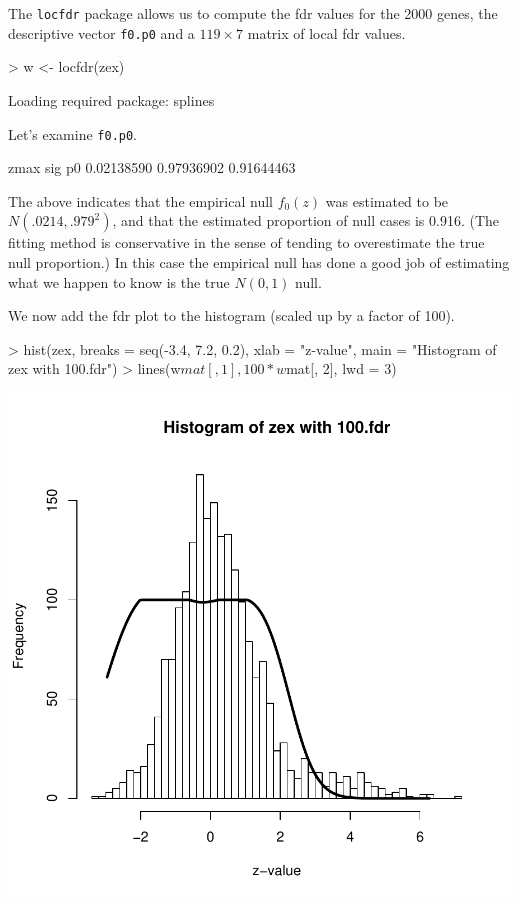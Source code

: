 \documentclass[11pt]{article}
\begin{document}
The \texttt{locfdr} package allows us to compute the fdr values for
the 2000 genes, the descriptive vector \texttt{f0.p0} and a $119\times
7$ matrix of local fdr values.

\begin{Schunk}
\begin{Sinput}
> w <- locfdr(zex)
\end{Sinput}
\begin{Soutput}
Loading required package: splines 
\end{Soutput}
\end{Schunk}

Let's examine \texttt{f0.p0}. 

\begin{Schunk}
\begin{Soutput}
      zmax        sig         p0 
0.02138590 0.97936902 0.91644463 
\end{Soutput}
\end{Schunk}

The above indicates that the empirical null $f_0(z)$ was estimated to
be $N(.0214,.979^2)$, and that the estimated proportion of null cases
is 0.916. (The fitting method is conservative in the sense of tending
to overestimate the true null proportion.) In this case the empirical
null has done a good job of estimating what we happen to know is the
true $N(0,1)$ null.

We now add the fdr plot to the histogram (scaled up by a factor of
100).

\begin{Schunk}
\begin{Sinput}
> hist(zex, breaks = seq(-3.4, 7.2, 0.2), xlab = "z-value", main = "Histogram of zex with 100.fdr")
> lines(w$mat[, 1], 100 * w$mat[, 2], lwd = 3)
\end{Sinput}
\end{Schunk}
\includegraphics{locfdr-example-FDR-Plot}
\end{document}
